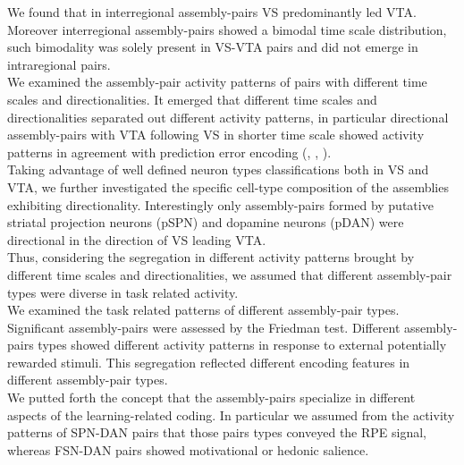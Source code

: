 We found that in interregional assembly-pairs VS predominantly led VTA. Moreover interregional assembly-pairs showed a bimodal time scale distribution, such bimodality was solely present in VS-VTA pairs and did not emerge in intraregional pairs.\\We examined the assembly-pair activity patterns of pairs with different time scales and directionalities. It emerged that different time scales and directionalities separated out different activity patterns, in particular directional assembly-pairs with VTA following VS in shorter time scale showed activity patterns in agreement with prediction error encoding (\cite{Tobler2003}, \cite{Nomoto2010}, \cite{Schultz2016}).\\Taking advantage of well defined neuron types classifications both in VS and VTA, we further investigated the specific cell-type composition of the assemblies exhibiting directionality. Interestingly only assembly-pairs formed by putative striatal projection neurons (pSPN) and dopamine neurons (pDAN) were directional in the direction of VS leading VTA.\\Thus, considering the segregation in different activity patterns brought by different time scales and directionalities, we assumed that different assembly-pair types were diverse in task related activity.\\We examined the task related patterns of different assembly-pair types. Significant assembly-pairs were assessed by the Friedman test. Different assembly-pairs types showed different activity patterns in response to external potentially rewarded stimuli. This segregation reflected different encoding features in different assembly-pair types.\\We putted forth the concept that the assembly-pairs specialize in different aspects of the learning-related coding. In particular we assumed from the activity patterns of SPN-DAN pairs that those pairs types conveyed the RPE signal, whereas FSN-DAN pairs showed motivational or hedonic salience.\\%
